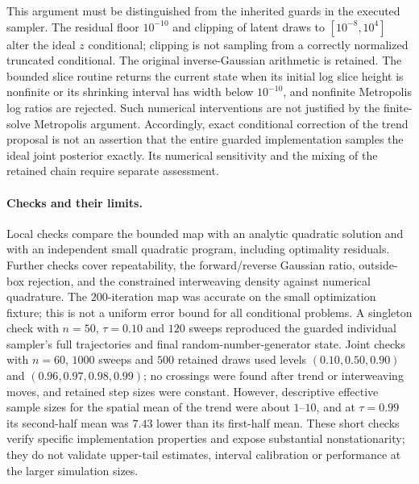 This argument must be distinguished from the inherited guards in the executed sampler. The residual floor $10^{-10}$ and clipping of latent draws to $[10^{-8},10^4]$ alter the ideal $z$ conditional; clipping is not sampling from a correctly normalized truncated conditional. The original inverse-Gaussian arithmetic is retained. The bounded slice routine returns the current state when its initial log slice height is nonfinite or its shrinking interval has width below $10^{-10}$, and nonfinite Metropolis log ratios are rejected. Such numerical interventions are not justified by the finite-solve Metropolis argument. Accordingly, exact conditional correction of the trend proposal is not an assertion that the entire guarded implementation samples the ideal joint posterior exactly. Its numerical sensitivity and the mixing of the retained chain require separate assessment.

\paragraph{Checks and their limits.} Local checks compare the bounded map with an analytic quadratic solution and with an independent small quadratic program, including optimality residuals. Further checks cover repeatability, the forward/reverse Gaussian ratio, outside-box rejection, and the constrained interweaving density against numerical quadrature. The $200$-iteration map was accurate on the small optimization fixture; this is not a uniform error bound for all conditional problems. A singleton check with $n=50$, $\tau=0.10$ and $120$ sweeps reproduced the guarded individual sampler's full trajectories and final random-number-generator state. Joint checks with $n=60$, $1000$ sweeps and $500$ retained draws used levels $(0.10,0.50,0.90)$ and $(0.96,0.97,0.98,0.99)$; no crossings were found after trend or interweaving moves, and retained step sizes were constant. However, descriptive effective sample sizes for the spatial mean of the trend were about $1$--$10$, and at $\tau=0.99$ its second-half mean was $7.43$ lower than its first-half mean. These short checks verify specific implementation properties and expose substantial nonstationarity; they do not validate upper-tail estimates, interval calibration or performance at the larger simulation sizes.
